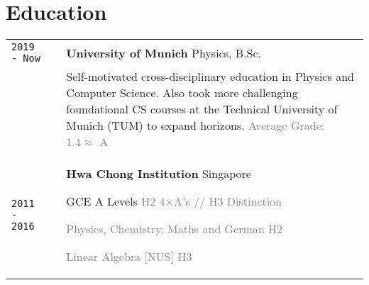 \section{\textcolor{section_1}{Education}}
\vspace{-\baselineskip}
{
	\ff
	\renewcommand{\arraystretch}{1.9}
	\begin{tabularx}{\textwidth}{@{}l p{0.3cm} X@{}}
		\texttt{\large 2019 - Now} & & \textbf{University of Munich} \hfill {\ff Physics, B.Sc.} \\[-0.5em]
		&& {\footnotesize Self-motivated cross-disciplinary education in Physics and Computer Science. Also took more challenging foundational CS courses at the Technical University of Munich (TUM) to expand horizons. \hfill \textcolor{gray}{Average Grade: $1.4 \approx $ A}}
		\\
		\texttt{\large 2011 - 2016} & & \textbf{Hwa Chong Institution} \hfill {\ff Singapore}
		\par 
		\vspace{1mm} GCE A Levels \hfill \textcolor{gray}{\fontsize{10}{12} H2 4$\times$A's // H3 Distinction}
		\par \hfill \textcolor{gray}{{\scriptsize Physics, Chemistry, Maths and German} \hspace{1em} \ff H2}
		\par \hfill \textcolor{gray}{{\scriptsize Linear Algebra [NUS]} \hspace{1em} \ff H3} %
	\end{tabularx}
}